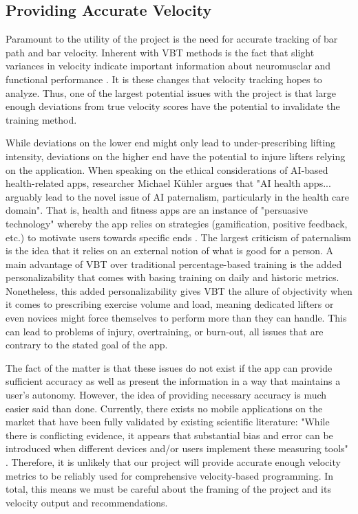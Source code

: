 \documentclass[10pt,twocolumn]{article}
\begin{document}
\subsection{Providing Accurate Velocity}
Paramount to the utility of the project is the need for accurate tracking of bar path and bar velocity. 
Inherent with VBT methods is the fact that slight variances in velocity indicate important information about neuromusclar and functional performance \cite{Dorrell2020}. 
It is these changes that velocity tracking hopes to analyze. 
Thus, one of the largest potential issues with the project is that large enough deviations from true velocity scores have the potential to invalidate the training method.  \par

While deviations on the lower end might only lead to under-prescribing lifting intensity, deviations on the higher end have the potential to injure lifters relying on the application. 
When speaking on the ethical considerations of AI-based health-related apps, researcher Michael Kühler argues that "AI health apps... arguably lead to the novel issue of AI paternalism, particularly in the health care domain". 
That is, health and fitness apps are an instance of "persuasive technology" whereby the app relies on strategies (gamification, positive feedback, etc.) to motivate users towards specific ends \cite{Kuhler2022}. 
The largest criticism of paternalism is the idea that it relies on an external notion of what is good for a person. 
A main advantage of VBT over traditional percentage-based training is the added personalizability that comes with basing training on daily and historic metrics.
Nonetheless, this added personalizability gives VBT the allure of objectivity when it comes to prescribing exercise volume and load, meaning dedicated lifters or even novices might force themselves to perform more than they can handle.
This can lead to problems of injury, overtraining, or burn-out, all issues that are contrary to the stated goal of the app.\par

The fact of the matter is that these issues do not exist if the app can provide sufficient accuracy as well as present the information in a way that maintains a user's autonomy. 
However, the idea of providing necessary accuracy is much easier said than done.
Currently, there exists no mobile applications on the market that have been fully validated by existing scientific literature: "While there is conflicting evidence, it appears that substantial bias and error can be introduced when different devices and/or users implement these measuring tools" \cite{Weakley2021}. 
Therefore, it is unlikely that our project will provide accurate enough velocity metrics to be reliably used for comprehensive velocity-based programming. 
In total, this means we must be careful about the framing of the project and its velocity output and recommendations.
\end{document}
